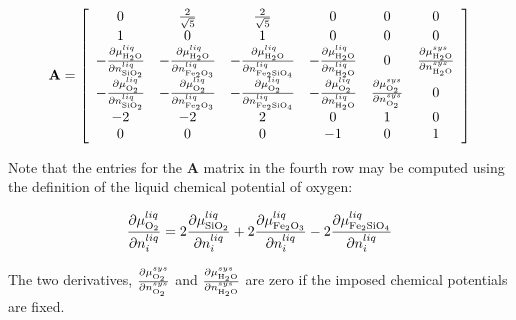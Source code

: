\documentclass[11pt, titlepage, twoside]{article}
\begin{document}
\begin{MPEquation}[!ht]
\begin{equation}
{\bf{A}} = \left[ {\begin{array}{*{20}{c}}
0&{\frac{2}{{\sqrt 5 }}}&{\frac{2}{{\sqrt 5 }}}&0&0&0\\
1&0&1&0&0&0\\
{ - \frac{{\partial \mu _{{{\rm{H}}_{\rm{2}}}{\rm{O}}}^{liq}}}{{\partial n_{{\rm{Si}}{{\rm{O}}_2}}^{liq}}}}&{ - \frac{{\partial \mu _{{{\rm{H}}_{\rm{2}}}{\rm{O}}}^{liq}}}{{\partial n_{{\rm{F}}{{\rm{e}}_{\rm{2}}}{{\rm{O}}_3}}^{liq}}}}&{ - \frac{{\partial \mu _{{{\rm{H}}_{\rm{2}}}{\rm{O}}}^{liq}}}{{\partial n_{{\rm{F}}{{\rm{e}}_{\rm{2}}}{\rm{Si}}{{\rm{O}}_4}}^{liq}}}}&{ - \frac{{\partial \mu _{{{\rm{H}}_{\rm{2}}}{\rm{O}}}^{liq}}}{{\partial n_{{{\rm{H}}_{\rm{2}}}{\rm{O}}}^{liq}}}}&0&{\frac{{\partial \mu _{{{\rm{H}}_{\rm{2}}}{\rm{O}}}^{sys}}}{{\partial n_{{{\rm{H}}_{\rm{2}}}{\rm{O}}}^{sys}}}}\\
{ - \frac{{\partial \mu _{{{\rm{O}}_{\rm{2}}}}^{liq}}}{{\partial n_{{\rm{Si}}{{\rm{O}}_2}}^{liq}}}}&{ - \frac{{\partial \mu _{{{\rm{O}}_{\rm{2}}}}^{liq}}}{{\partial n_{{\rm{F}}{{\rm{e}}_{\rm{2}}}{{\rm{O}}_3}}^{liq}}}}&{ - \frac{{\partial \mu _{{{\rm{O}}_{\rm{2}}}}^{liq}}}{{\partial n_{{\rm{F}}{{\rm{e}}_{\rm{2}}}{\rm{Si}}{{\rm{O}}_4}}^{liq}}}}&{ - \frac{{\partial \mu _{{{\rm{O}}_{\rm{2}}}}^{liq}}}{{\partial n_{{{\rm{H}}_{\rm{2}}}{\rm{O}}}^{liq}}}}&{\frac{{\partial \mu _{{{\rm{O}}_{\rm{2}}}}^{sys}}}{{\partial n_{{{\rm{O}}_2}}^{sys}}}}&0\\
{ - 2}&{ - 2}&2&0&1&0\\
0&0&0&{ - 1}&0&1
\end{array}} \right]
\end{equation}
\label{MPEquationElement:F96AF3BC-E6EF-41BC-D2B7-7CA443AB2721}
\end{MPEquation}
Note that the entries for the \textbf{A} matrix in the fourth row may be computed using the definition of the liquid chemical potential of oxygen:


\begin{MPEquation}[!ht]
\begin{equation}
\frac{{\partial \mu _{{{\rm{O}}_2}}^{liq}}}{{\partial n_i^{liq}}} = 2\frac{{\partial \mu _{{\rm{Si}}{{\rm{O}}_2}}^{liq}}}{{\partial n_i^{liq}}} + 2\frac{{\partial \mu _{{\rm{F}}{{\rm{e}}_{\rm{2}}}{{\rm{O}}_3}}^{liq}}}{{\partial n_i^{liq}}} - 2\frac{{\partial \mu _{{\rm{F}}{{\rm{e}}_{\rm{2}}}{\rm{Si}}{{\rm{O}}_4}}^{liq}}}{{\partial n_i^{liq}}}
\end{equation}
\label{MPEquationElement:0B2E8025-ED86-43D8-90C4-AFD43412BF16}
\end{MPEquation}
The two derivatives, ${\frac{{\partial \mu _{{{\rm{O}}_{\rm{2}}}}^{sys}}}{{\partial n_{{{\rm{O}}_2}}^{sys}}}}$ and ${\frac{{\partial \mu _{{{\rm{H}}_{\rm{2}}}{\rm{O}}}^{sys}}}{{\partial n_{{{\rm{H}}_{\rm{2}}}{\rm{O}}}^{sys}}}}$ are zero if the imposed chemical potentials are fixed.
\end{document}
